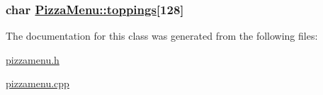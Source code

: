 \hypertarget{class_pizza_menu_b4f1e053cb69bc112e31a52a18d64dbd}{
\subsubsection[toppings]{\setlength{\rightskip}{0pt plus 5cm}char \hyperlink{class_pizza_menu_b4f1e053cb69bc112e31a52a18d64dbd}{Pizza\-Menu::toppings}\mbox{[}128\mbox{]}}}
\label{class_pizza_menu_b4f1e053cb69bc112e31a52a18d64dbd}




The documentation for this class was generated from the following files:\begin{CompactItemize}
\item 
\hyperlink{pizzamenu_8h}{pizzamenu.h}\item 
\hyperlink{pizzamenu_8cpp}{pizzamenu.cpp}\end{CompactItemize}
